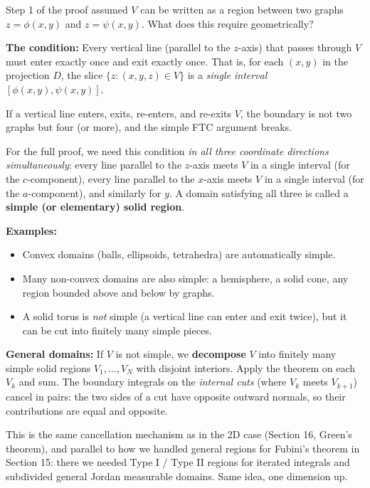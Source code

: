 \documentclass[11pt]{report}
\begin{document}
\begin{remark}
Step 1 of the proof assumed $V$ can be written as a region between two graphs $z = \phi(x,y)$ and $z = \psi(x,y)$. What does this require geometrically?

\textbf{The condition:} Every vertical line (parallel to the $z$-axis) that passes through $V$ must enter exactly once and exit exactly once. That is, for each $(x,y)$ in the projection $D$, the slice $\{z : (x,y,z) \in V\}$ is a \textit{single interval} $[\phi(x,y), \psi(x,y)]$.

If a vertical line enters, exits, re-enters, and re-exits $V$, the boundary is not two graphs but four (or more), and the simple FTC argument breaks.

For the full proof, we need this condition \textit{in all three coordinate directions simultaneously}: every line parallel to the $z$-axis meets $V$ in a single interval (for the $c$-component), every line parallel to the $x$-axis meets $V$ in a single interval (for the $a$-component), and similarly for $y$. A domain satisfying all three is called a \textbf{simple (or elementary) solid region}.

\textbf{Examples:}
\begin{itemize}
    \item Convex domains (balls, ellipsoids, tetrahedra) are automatically simple.
    \item Many non-convex domains are also simple: a hemisphere, a solid cone, any region bounded above and below by graphs.
    \item A solid torus is \textit{not} simple (a vertical line can enter and exit twice), but it can be cut into finitely many simple pieces.
\end{itemize}

\textbf{General domains:} If $V$ is not simple, we \textbf{decompose} $V$ into finitely many simple solid regions $V_1, \ldots, V_N$ with disjoint interiors. Apply the theorem on each $V_k$ and sum. The boundary integrals on the \textit{internal cuts} (where $V_k$ meets $V_{k+1}$) cancel in pairs: the two sides of a cut have opposite outward normals, so their contributions are equal and opposite.

This is the same cancellation mechanism as in the 2D case (Section 16, Green's theorem), and parallel to how we handled general regions for Fubini's theorem in Section 15: there we needed Type I / Type II regions for iterated integrals and subdivided general Jordan measurable domains. Same idea, one dimension up.
\end{remark}
\end{document}
